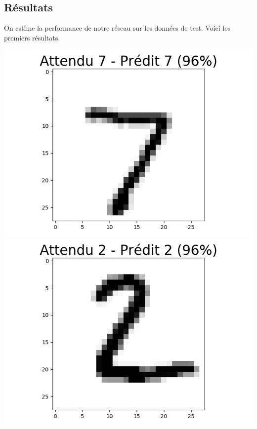 \documentclass[11pt,class=report,crop=false]{standalone}
\begin{document}
\subsection{Résultats}

On estime la performance de notre réseau sur les données de test.
Voici les premiers résultats.

\begin{center}
\includegraphics[scale=\myscale,scale=0.20]{figures/tf2-chiffre-test-result-0}
\includegraphics[scale=\myscale,scale=0.20]{figures/tf2-chiffre-test-result-1}

\end{center}
\end{document}
